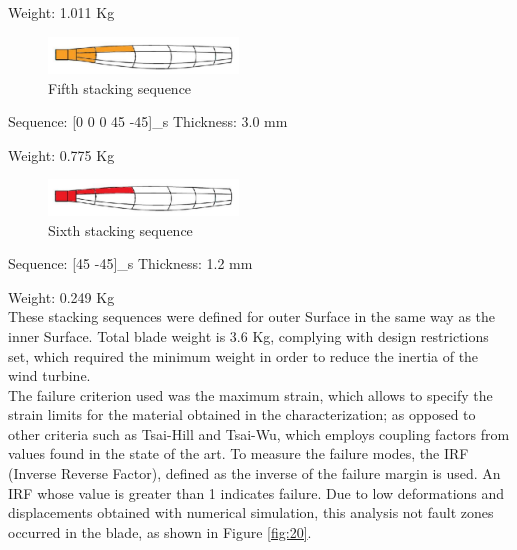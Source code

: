 \hspace{2cm}Weight: 1.011 Kg
\begin{figure}[H]
  \includegraphics[width=0.45\textwidth]{p11}
\caption{Fifth stacking sequence  }
\label{fig:18}       %
\end{figure}
Sequence: [0 0 0 45 -45]_s	\hspace{1cm}Thickness: 3.0 mm 

\hspace{2cm}Weight: 0.775 Kg
\begin{figure}[H]
  \includegraphics[width=0.45\textwidth]{p12}
\caption{Sixth stacking sequence  }
\label{fig:19}       %
\end{figure}
Sequence: [45 -45]_s	\hspace{1cm}Thickness: 1.2 mm 

\hspace{2cm}Weight: 0.249 Kg\\

These stacking sequences were defined for outer Surface in the same way as the inner Surface. Total blade weight is 3.6 Kg, complying with design restrictions set, which required the minimum weight in order to reduce the inertia of the wind turbine. \\

The failure criterion used was the maximum strain, which allows to specify the strain limits for the material obtained in the characterization; as opposed to other criteria such as Tsai-Hill and Tsai-Wu, which employs coupling factors from values found in the state of the art. To measure the failure modes, the IRF (Inverse Reverse Factor), defined as the inverse of the failure margin is used. An IRF whose value is greater than 1 indicates failure. Due to low deformations and displacements obtained with numerical simulation, this analysis not fault zones occurred in the blade, as shown in Figure \ref{fig:20}.


